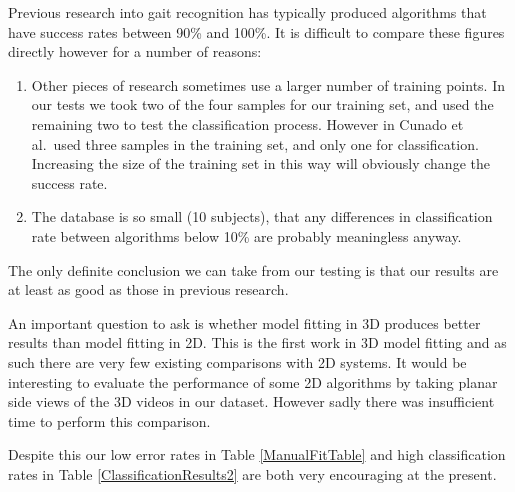Previous research into gait recognition has typically produced algorithms that have success rates between 90\% and 100\%.
It is difficult to compare these figures directly however for a number of reasons:

\begin{enumerate}
	\item Other pieces of research sometimes use a larger number of training points.
		In our tests we took two of the four samples for our training set, and used the remaining two to test the classification process.
		However in \cite{GaitModels} Cunado et al.\ used three samples in the training set, and only one for classification.
		Increasing the size of the training set in this way will obviously change the success rate.
	\item The database is so small (10 subjects), that any differences in classification rate between algorithms below 10\% are probably meaningless anyway.
\end{enumerate}

The only definite conclusion we can take from our testing is that our results are at least as good as those in previous research.

\bigskip
\noindent An important question to ask is whether model fitting in 3D produces better results than model fitting in 2D.
This is the first work in 3D model fitting and as such there are very few existing comparisons with 2D systems.
It would be interesting to evaluate the performance of some 2D algorithms by taking planar side views of the 3D videos in our dataset.
However sadly there was insufficient time to perform this comparison.

Despite this our low error rates in Table \ref{ManualFitTable} and high classification rates in Table \ref{ClassificationResults2} are both very encouraging at the present.
